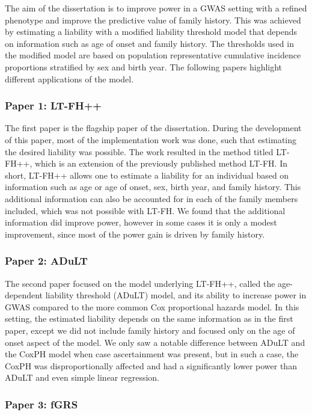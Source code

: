 The aim of the dissertation is to improve power in a GWAS setting with a refined phenotype and improve the predictive value of family history. This was achieved by estimating a liability with a modified liability threshold model that depends on information such as age of onset and family history. The thresholds used in the modified model are based on population representative cumulative incidence proportions stratified by sex and birth year. The following papers highlight different applications of the model.


\subsubsection{Paper 1: LT-FH++}
The first paper is the flagship paper of the dissertation. During the development of this paper, most of the implementation work was done, such that estimating the desired liability was possible. The work resulted in the method titled LT-FH++, which is an extension of the previously published method LT-FH. In short, LT-FH++ allows one to estimate a liability for an individual based on information such as age or age of onset, sex, birth year, and family history. This additional information can also be accounted for in each of the family members included, which was not possible with LT-FH. We found that the additional information did improve power, however in some cases it is only a modest improvement, since most of the power gain is driven by family history.

\subsubsection{Paper 2: ADuLT}
The second paper focused on the model underlying LT-FH++, called the age-dependent liability threshold (ADuLT) model, and its ability to increase power in GWAS compared to the more common Cox proportional hazards model. In this setting, the estimated liability depends on the same information as in the first paper, except we did not include family history and focused only on the age of onset aspect of the model. We only saw a notable difference between ADuLT and the CoxPH model when case ascertainment was present, but in such a case, the CoxPH was disproportionally affected and had a significantly lower power than ADuLT and even simple linear regression.

\subsubsection{Paper 3: fGRS}
